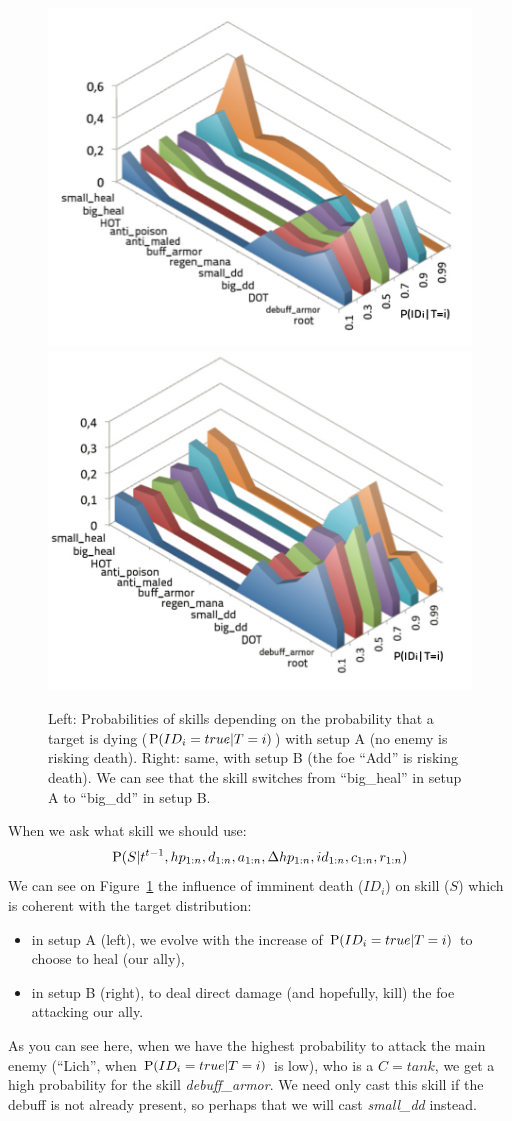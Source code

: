 \begin{figure}[h!]
\begin{center}
\includegraphics[width=0.496\columnwidth]{images/wow_distrib_skill1.png} \includegraphics[width=0.496\columnwidth]{images/wow_distrib_skill2.png}
\caption{Left: Probabilities of skills depending on the probability that a target is dying ($\mathrm{P}(ID_i=true|T=i)$) with setup A (no enemy is risking death). Right: same, with setup B (the foe ``Add'' is risking death). We can see that the skill switches from ``big\_heal'' in setup A to ``big\_dd'' in setup B.}
\label{fig:wow_skill}
\end{center}
\end{figure}


When we ask what skill we should use:
$$\mathrm{P}(S|t^{t-1},hp_{1:n},d_{1:n}, a_{1:n}, \Delta hp_{1:n}, id_{1:n}, c_{1:n}, r_{1:n})$$
We can see on Figure~\ref{fig:wow_skill} the influence of imminent death ($ID_i$) on skill ($S$) which is coherent with the target distribution: 
\begin{itemize}
    \item in setup A (left), we evolve with the increase of $\mathrm{P}(ID_i=true|T=i)$ to choose to heal (our ally), 
    \item in setup B (right), to deal direct damage (and hopefully, kill) the foe attacking our ally.
\end{itemize} 
As you can see here, when we have the highest probability to attack the main enemy (``Lich'', when $\mathrm{P}(ID_i=true|T=i)$ is low), who is a $C=tank$, we get a high probability for the skill \textit{debuff\_armor}. We need only cast this skill if the debuff is not already present, so perhaps that we will cast \textit{small\_dd} instead. 

